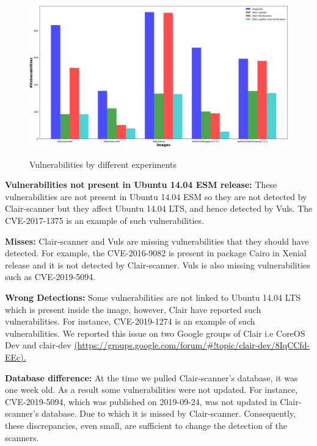 \documentclass[a4paper,num-refs]{oup-contemporary}
\begin{document}
\begin{figure}[!ht]
        {\includegraphics[scale=1.5,width=\textwidth]
        {Figures/bargraph.png}}
	\vspace*{-5mm}
        \caption{\label{fig:bargraph} Vulnerabilities by different experiments}
      \end{figure}
\textbf{Vulnerabilities not present in Ubuntu 14.04 ESM release:} These vulnerabilities are not present in Ubuntu 14.04 ESM so they 
are not detected by Clair-scanner but they affect Ubuntu 14.04 LTS, and hence detected by Vuls. The CVE-2017-1375 is an example
of such vulnerabilities.

\textbf{Misses:} Clair-scanner and Vuls
are missing vulnerabilities that they should have detected. For example, the CVE-2016-9082 
is present in package Cairo in Xenial release and it is not detected by Clair-scanner.
Vuls is also missing vulnerabilities such as CVE-2019-5094.

\textbf{Wrong Detections:} 
Some vulnerabilities are not linked to Ubuntu 14.04 LTS which is 
present inside the image, however, Clair have reported such vulnerabilities.
For instance, CVE-2019-1274 is an example of such vulnerabilities. 
We reported this issue on two Google groups of Clair i.e CoreOS Dev and
clair-dev \url{(https://groups.google.com/forum/\#!topic/clair-dev/8IqCCfd-EEc).}

\textbf{Database difference:} At the time we pulled Clair-scanner's database, it was one week old.
                              As a result some vulnerabilities were not updated. For instance, CVE-2019-5094, which
		              was published on 2019-09-24, was not 
		              updated in Clair-scanner's database. Due to which it is missed by Clair-scanner.
			      Consequently, these discrepancies, even small, are sufficient to change the detection of
			      the scanners.
\end{document}

